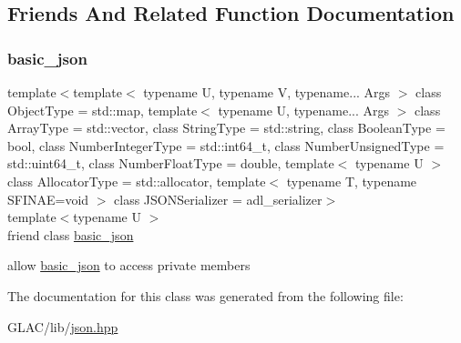 \subsection{Friends And Related Function Documentation}
\mbox{\label{classnlohmann_1_1basic__json_1_1iter__impl_ada3100cdb8700566051828f1355fa745}} 
\subsubsection{\texorpdfstring{basic\_json}{basic\_json}}
{\footnotesize\ttfamily template$<$template$<$ typename U, typename V, typename... Args $>$ class Object\+Type = std\+::map, template$<$ typename U, typename... Args $>$ class Array\+Type = std\+::vector, class String\+Type  = std\+::string, class Boolean\+Type  = bool, class Number\+Integer\+Type  = std\+::int64\+\_\+t, class Number\+Unsigned\+Type  = std\+::uint64\+\_\+t, class Number\+Float\+Type  = double, template$<$ typename U $>$ class Allocator\+Type = std\+::allocator, template$<$ typename T, typename S\+F\+I\+N\+A\+E=void $>$ class J\+S\+O\+N\+Serializer = adl\+\_\+serializer$>$ \\
template$<$typename U $>$ \\
friend class \mbox{\hyperlink{classnlohmann_1_1basic__json}{basic\+\_\+json}}\hspace{0.3cm}{\ttfamily [friend]}}



allow \mbox{\hyperlink{classnlohmann_1_1basic__json}{basic\+\_\+json}} to access private members 



The documentation for this class was generated from the following file\+:\begin{DoxyCompactItemize}
\item 
G\+L\+A\+C/lib/\mbox{\hyperlink{json_8hpp}{json.\+hpp}}\end{DoxyCompactItemize}
